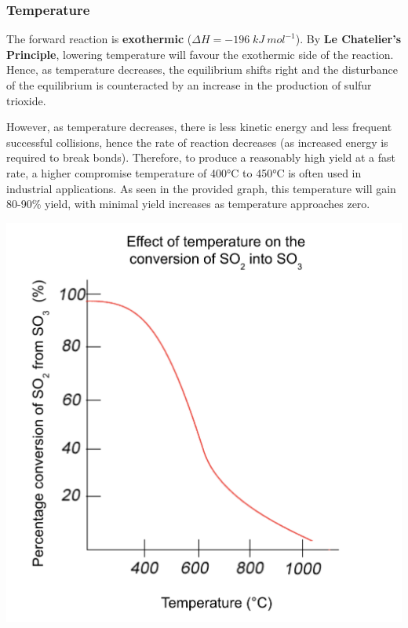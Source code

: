 \documentclass[12pt, a4paper]{article}
\begin{document}
\subsubsection{Temperature}

The forward reaction is \textbf{exothermic} (\(\Delta H = -196 \; kJ \: mol^{-1}\)). By \textbf{Le Chatelier's Principle}, lowering temperature will favour the exothermic side of the reaction. Hence, as temperature decreases, the equilibrium shifts right and the disturbance of the equilibrium is counteracted by an increase in the production of sulfur trioxide. 

However, as temperature decreases, there is less kinetic energy and less frequent successful collisions, hence the rate of reaction decreases (as increased energy is required to break bonds). Therefore, to produce a reasonably high yield at a fast rate, a higher compromise temperature of 400°C to 450°C is often used in industrial applications. As seen in the provided graph, this temperature will gain 80-90\% yield, with minimal yield increases as temperature approaches zero.

\begin{center}
\includegraphics[scale=0.5]{graph}
\end{center}
\end{document}
